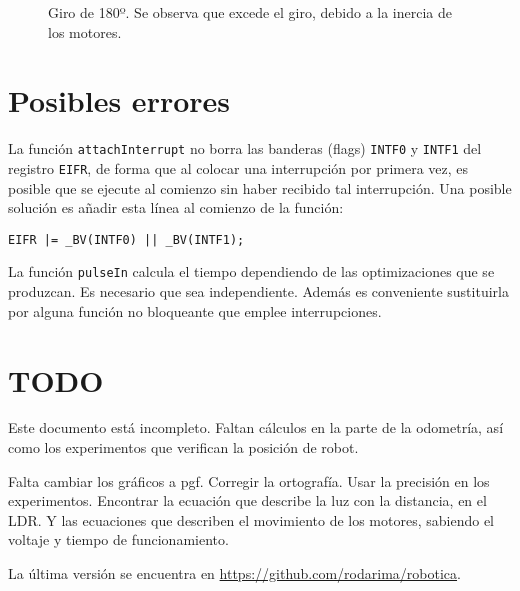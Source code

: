 \documentclass[10pt,a4paper,hidelinks,twocolumn]{article}
\begin{document}
\begin{figure}[h]
\centering
{}
\caption{Giro de 180º. Se observa que excede el giro, debido a la inercia de los
motores.\label{fig:giro-180}}
\end{figure}







\section{Posibles errores}

La función \texttt{attachInterrupt} no borra las banderas (flags) \texttt{INTF0} 
y \texttt{INTF1} del registro \texttt{EIFR}, de forma que al colocar una 
interrupción por primera vez, es posible que se ejecute al comienzo sin haber 
recibido tal interrupción. Una posible solución es añadir esta línea al comienzo 
de la función:

\texttt{EIFR |= \_BV(INTF0) || \_BV(INTF1);}

La función \texttt{pulseIn} calcula el tiempo dependiendo de las optimizaciones
que se produzcan. Es necesario que sea independiente. Además es conveniente
sustituirla por alguna función no bloqueante que emplee interrupciones.
\section{TODO}
Este documento está incompleto. Faltan cálculos en la parte de la odometría, así 
como los experimentos que verifican la posición de robot.

Falta cambiar los gráficos a pgf. Corregir la ortografía. Usar la precisión en 
los experimentos. Encontrar la ecuación que describe la luz con la distancia, en 
el LDR. Y las ecuaciones que describen el movimiento de los motores, sabiendo el 
voltaje y tiempo de funcionamiento.

La última versión se encuentra en \url{https://github.com/rodarima/robotica}.
\end{document}
